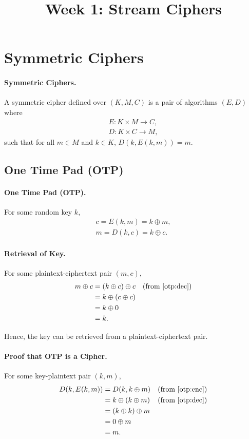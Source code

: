 \documentclass{article}
\begin{document}
\title{Week 1: Stream Ciphers}
\maketitle

\section{Symmetric Ciphers}

\paragraph{Symmetric Ciphers.} A symmetric cipher defined over $(K, M, C)$ is a
pair of algorithms $(E, D)$ where \begin{gather*}
  E: K \times M \rightarrow C, \\
  D: K \times C \rightarrow M,
\end{gather*} such that for all $m \in M$ and $k \in K$, $D(k, E(k, m)) = m$.

\subsection{One Time Pad (OTP)}

\paragraph{One Time Pad (OTP).} For some random key $k$, \begin{gather}
  c = E(k, m) = k \oplus m, \label{otp:enc} \\
  m = D(k, c) = k \oplus c. \label{otp:dec}
\end{gather}

\paragraph{Retrieval of Key.} For some plaintext-ciphertext pair $(m, c)$,
\begin{align*}
  m \oplus c &= (k \oplus c) \oplus c &&\text{(from \eqref{otp:dec})} \\
    &= k \oplus (c \oplus c) \\
    &= k \oplus 0 \\
    &= k.
\end{align*}

Hence, the key can be retrieved from a plaintext-ciphertext pair.

\paragraph{Proof that OTP is a Cipher.} For some key-plaintext pair $(k, m)$,
\begin{align*}
  D(k, E(k, m)) &= D(k, k \oplus m) &&\text{(from \eqref{otp:enc})} \\
    &= k \oplus (k \oplus m) &&\text{(from \eqref{otp:dec})} \\
    &= (k \oplus k) \oplus m \\
    &= 0 \oplus m \\
    &= m.
\end{align*}
\end{document}
